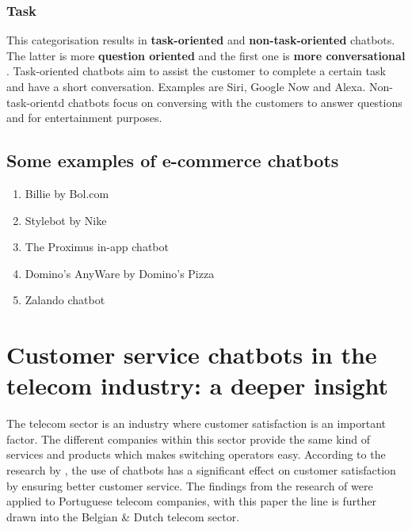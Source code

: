 \subsubsection{Task}
This categorisation results in \textbf{task-oriented} and \textbf{non-task-oriented} chatbots. The latter is more \textbf{question oriented} and the first one is \textbf{more conversational} \citep{Nuruzzaman2018}. Task-oriented chatbots aim to assist the customer to complete a certain task and have a short conversation. Examples are Siri, Google Now and Alexa. Non-task-orientd chatbots focus on conversing with the customers to answer questions and for entertainment purposes. \citep{Nuruzzaman2018}\\

\subsection{Some examples of e-commerce chatbots}
\begin{enumerate}
	\item Billie by Bol.com
	\item Stylebot by Nike
	\item The Proximus in-app chatbot
	\item Domino's AnyWare by Domino's Pizza
	\item Zalando chatbot
\end{enumerate}

\section{Customer service chatbots in the telecom industry: a deeper insight}
The telecom sector is an industry where customer satisfaction is an important factor. The different companies within this sector provide the same kind of services and products which makes switching operators easy. According to the research by \citep{Quintino2019}, the use of chatbots has a significant effect on customer satisfaction by ensuring better customer service. The findings from the research of \citeauthor{Quintino1019} were applied to Portuguese telecom companies, with this paper the line is further drawn into the Belgian \& Dutch telecom sector.\\

